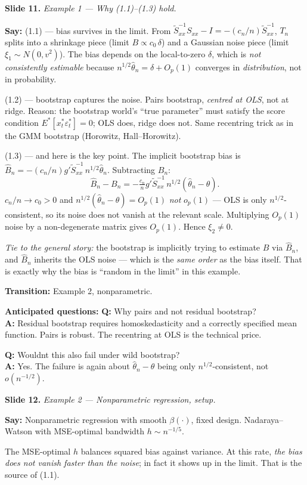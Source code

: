 \documentclass[11pt]{article}
\theoremstyle{definition}
\newcommand{\Tn}{T_{n}}
\newcommand{\Bn}{B_{n}}
\newcommand{\Bnh}{\hat{B}_{n}}
\newcommand{\slide}[2]{%
  \medskip
  \noindent\colorbox{soft}{\parbox{\linewidth}{\textbf{Slide #1.} \textit{#2}}}
  \medskip
}
\newcommand{\say}[1]{\textbf{Say:} #1}
\newcommand{\trans}[1]{\textbf{Transition:} #1}
\newcommand{\Q}[2]{\noindent\textcolor{warn}{\textbf{Q:}} #1\\ \textcolor{accent}{\textbf{A:}} #2\par\smallskip}
\begin{document}
\slide{11}{Example 1 --- Why (1.1)--(1.3) hold.}
\say{(1.1) --- bias survives in the limit. From
$\tilde S_{xx}^{-1}S_{xx}-I=-(c_n/n)\tilde S_{xx}^{-1}$,
$\Tn$ splits into a shrinkage piece (limit $B \propto c_0\,\delta$) and a
Gaussian noise piece (limit $\xi_1\sim N(0,v^2)$). The bias depends on the
local-to-zero $\delta$, which is \emph{not consistently estimable} because
$n^{1/2}\hat\theta_n=\delta+O_p(1)$ converges in \emph{distribution}, not in
probability.

(1.2) --- bootstrap captures the noise. Pairs bootstrap, \emph{centred at OLS},
not at ridge. Reason: the bootstrap world's ``true parameter'' must satisfy
the score condition $E^*[x_t^*\varepsilon_t^*]=0$; OLS does, ridge does not.
Same recentring trick as in the GMM bootstrap (Horowitz, Hall--Horowitz).

(1.3) --- and here is the key point. The implicit bootstrap bias is
$\Bnh = -(c_n/n)g'\tilde S_{xx}^{-1}\,n^{1/2}\hat\theta_n$. Subtracting
$\Bn$:
\[
  \Bnh-\Bn = -\tfrac{c_n}{n}g'\tilde S_{xx}^{-1}\,n^{1/2}(\hat\theta_n-\theta).
\]
$c_n/n\to c_0>0$ and $n^{1/2}(\hat\theta_n-\theta) = O_p(1)$ \emph{not}
$o_p(1)$ --- OLS is only $n^{1/2}$-consistent, so its noise does not vanish at
the relevant scale. Multiplying $O_p(1)$ noise by a non-degenerate matrix
gives $O_p(1)$. Hence $\xi_2\neq 0$.

\emph{Tie to the general story:} the bootstrap is implicitly trying to
estimate $B$ via $\Bnh$, and $\Bnh$ inherits the OLS noise --- which is the
\emph{same order} as the bias itself. That is exactly why the bias is
``random in the limit'' in this example.}

\trans{Example 2, nonparametric.}

\textbf{Anticipated questions:}
\Q{Why pairs and not residual bootstrap?}
{Residual bootstrap requires homoskedasticity and a correctly specified mean
function. Pairs is robust. The recentring at OLS is the technical price.}
\Q{Wouldnt this also fail under wild bootstrap?}
{Yes. The failure is again about $\hat\theta_n-\theta$ being only
$n^{1/2}$-consistent, not $o(n^{-1/2})$.}

\slide{12}{Example 2 --- Nonparametric regression, setup.}
\say{Nonparametric regression with smooth $\beta(\cdot)$, fixed design.
Nadaraya--Watson with MSE-optimal bandwidth $h\sim n^{-1/5}$.

The MSE-optimal $h$ balances squared bias against variance. At this rate,
\emph{the bias does not vanish faster than the noise}; in fact it shows up in
the limit. That is the source of (1.1).}
\end{document}
